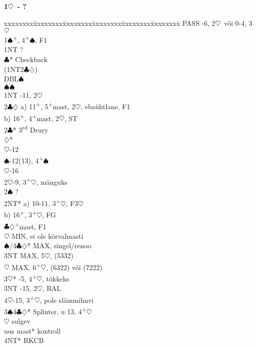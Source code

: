 \documentclass[10pt]{article}
\renewcommand{\c}{$\clubsuit$}
\renewcommand{\d}{$\diamondsuit$}
\newcommand{\h}{$\heartsuit$}
\newcommand{\s}{$\spadesuit$}
\newcommand{\p}{\textsuperscript{+}}
\newcommand{\m}{\textsuperscript{\textminus}}
\newcommand{\x}{DBL}
\newcommand{\rdh}{3\textsuperscript{rd}}
\newenvironment{bidtable}[1][]
{\textbf{#1}
  \begin{adjustwidth}{1em}{}
    \addvspace{2pt}
    \begin{tabbing}
      xxxxxxxx\=xxxxxxxx\=xxxxxxxx\=xxxxxxxx\=xxxxxxxx\=xxxxxxxx\=\kill}
{\end{tabbing}\end{adjustwidth}\bigskip}%
\begin{document}
\begin{multicols*}{2}
\begin{bidtable}[1\h\ - ?]
PASS       -6, 2\m\h\ või 0-4, 3\h                    \\
1\s        {}\p, 4\p\s , F1                             \\
           \> 1NT        \> ?                             \\
           \>            \c* \> Checkback             \\
           \> (1NT2\c\d) \>                               \\
           \>            \> \x   {}\s                   \\
           \>            \s  {}\s                   \\
1NT        -11, 2\m\h                                 \\
2\c\d      \> a) 11\p, 5\p mast, 2\m\h, ebaühtlane, F1    \\
           \> b) 16\p, 4\p mast, 2\m\h, ST                \\
2\c* \rdh  \> Drury                                       \\
           \d*       {}\m                           \\
           \h        {}-12                         \\
           \s        {}-12(13), 4\p\s               \\
           \h        {}-16                         \\
2\h        {}-9, 3\p\h, mänguks                         \\
2\s        \> ?                                           \\
2NT*       \> a) 10-11, 3\p\h, F3\h                       \\
           \> b) 16\p, 3\p\h, FG                          \\
           \c\d      {}\p mast, F1                  \\
           \h        \> MIN, ei ole kõrvalmasti       \\
           \s/4\c\d* \> MAX, singel/renoo             \\
           \> 3NT        \> MAX, 5\h, (5332)              \\
           \h        \> MAX, 6\p\h, (6322) või (7222) \\
3\h*       {}-5, 4\p\h, tõkkeks                         \\
3NT        -15, 2\m\h, BAL                           \\
4\h        {}-15, 3\p\h, pole slämmihuvi               \\
3\s 4\c\d* \> Splinter, u 13, 4\p\h                       \\
           \h        \> sulgev                        \\
           \> uus mast*  \> kontroll                      \\
           \> 4NT*       \> RKCB
\end{bidtable}


\end{multicols*}
\end{document}
